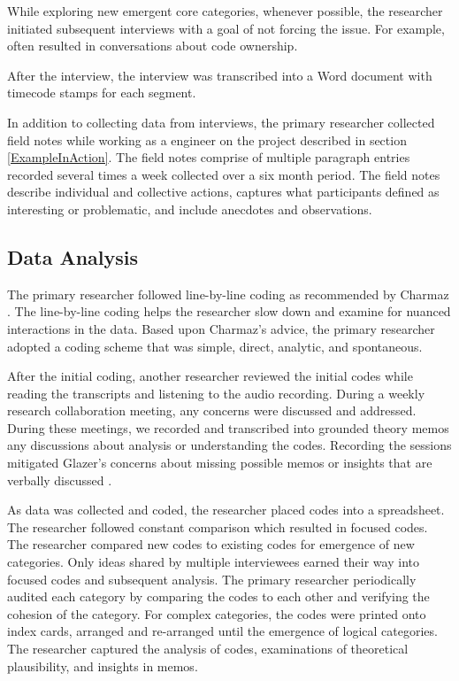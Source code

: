 While exploring new emergent core categories, whenever possible, the researcher initiated subsequent interviews with a goal of not forcing the issue. For example,  often resulted in conversations about code ownership. 

After the interview, the interview was transcribed into a Word document with timecode stamps for each segment.

In addition to collecting data from interviews, the primary researcher collected field notes while working as a engineer on the project described in section \ref{ExampleInAction}. The field notes comprise of multiple paragraph entries recorded several times a week collected over a six month period. The field notes describe individual and collective actions, captures what participants defined as interesting or problematic, and include anecdotes and observations. 
\subsection{Data Analysis}
The primary researcher followed line-by-line coding as recommended by Charmaz \cite{Charmaz}. The line-by-line coding helps the researcher slow down and examine for nuanced interactions in the data. Based upon Charmaz's advice, the primary researcher adopted a coding scheme that was simple, direct, analytic, and spontaneous.  

After the initial coding, another researcher reviewed the initial codes while reading the transcripts and listening to the audio recording. During a weekly research collaboration meeting, any concerns were discussed and addressed. During these meetings, we recorded and transcribed into grounded theory memos any discussions about analysis or understanding the codes. Recording the sessions mitigated Glazer's concerns about missing possible memos or insights that are verbally discussed \cite{GlaserTheoreticalSensitivity}.

As data was collected and coded, the researcher placed codes into a spreadsheet. The researcher followed constant comparison which resulted in focused codes.  The researcher compared new codes to existing codes for emergence of new categories. Only ideas shared by multiple interviewees earned their way into focused codes and subsequent analysis. The primary researcher periodically audited each category by comparing the codes to each other and verifying the cohesion of the category. For complex categories, the codes were printed onto index cards, arranged and re-arranged until the emergence of logical categories.  The researcher captured the analysis of codes, examinations of theoretical plausibility, and insights in memos. 

